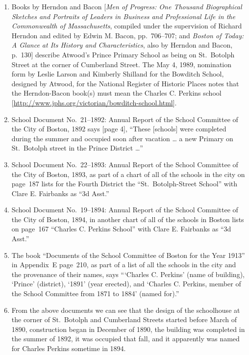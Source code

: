 \documentclass{article}
\begin{document}
\begin{enumerate}
\item Books by Herndon and Bacon [\textit{Men of Progress: One Thousand Biographical
Sketches and Portraits of Leaders in Business and Professional Life in the Commonwealth
of Massachusetts}, compiled under the supervision of Richard Herndon and edited by Edwin
M. Bacon, pp.\ 706--707; and \textit{Boston of Today:  A Glance at Its History and
Characteristics}, also by Herndon and Bacon, p.\ 130] describe Atwood's Prince Primary
School as being on St.\ Botolph Street at the corner of Cumberland Street. The May 4,
1989, nomination form by Leslie Larson and Kimberly Shilland for the Bowditch School,
designed by Atwood, for the National Register of Historic Places notes that the
Herndon-Bacon book(s) must mean the Charles C. Perkins school
[\url{http://www.jphs.org/victorian/bowditch-school.html}].


\item School Document No.\ 21--1892: Annual Report of the School Committee of the
City of Boston, 1892 says [page 4], ``These [schools] were completed during the summer
and occupied soon after vacation \dots{} a new Primary on St.\ Botolph street in the
Prince District \dots''


\item School Document No.\ 22--1893: Annual Report of the School Committee of the
City of Boston, 1893, as part of a chart of all of the schools in the city on page~187
lists for the Fourth District the  ``St.\ Botolph-Street School'' with Clare E. Fairbanks
as ``3d Asst.''


\item School Document No.\ 19--1894: Annual Report of the School Committee of the
City of Boston, 1894, in another chart of all of the schools in Boston lists on page~167
``Charles C. Perkins School'' with Clare E. Fairbanks as ``3d Asst.''


\item The book ``Documents of the School Committee of Boston for the Year 1913'' in
Appendix~E page~210, as part of a list of all the schools in the city and the provenance
of their names, says ``\thinspace `Charles C. Perkins' (name of building), `Prince'
(district), `1891' (year erected), and `Charles C. Perkins, member of the School
Committee from 1871 to 1884' (named for).''


\item From the above documents we can see that  the design of the schoolhouse at the
corner of St.\ Botolph and Cumberland Streets started before March of 1890, construction
began in December of 1890, the building was completed in the summer of 1892, it was
occupied that fall, and it apparently was named for Charles Perkins sometime in 1894.


\end{enumerate}
\end{document}
